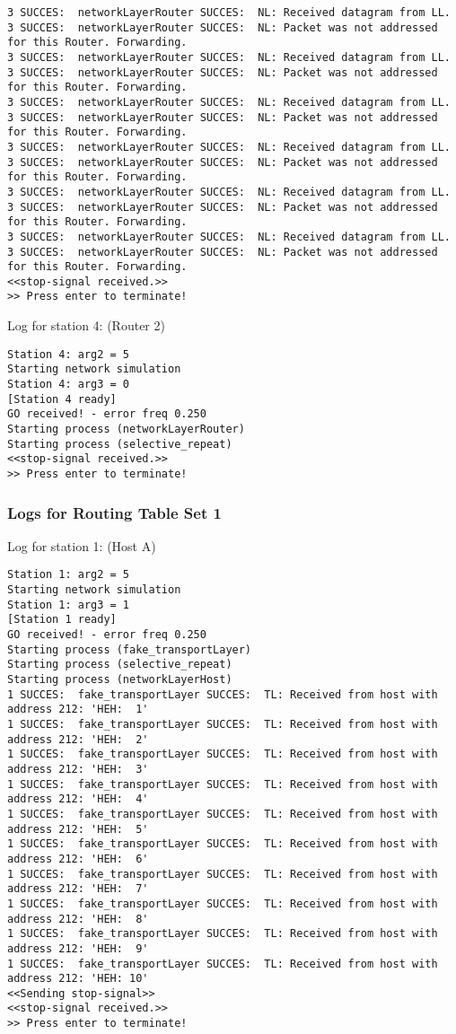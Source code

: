 \begin{lstlisting}[breaklines=true]
3 SUCCES:  networkLayerRouter SUCCES:  NL: Received datagram from LL.
3 SUCCES:  networkLayerRouter SUCCES:  NL: Packet was not addressed for this Router. Forwarding.
3 SUCCES:  networkLayerRouter SUCCES:  NL: Received datagram from LL.
3 SUCCES:  networkLayerRouter SUCCES:  NL: Packet was not addressed for this Router. Forwarding.
3 SUCCES:  networkLayerRouter SUCCES:  NL: Received datagram from LL.
3 SUCCES:  networkLayerRouter SUCCES:  NL: Packet was not addressed for this Router. Forwarding.
3 SUCCES:  networkLayerRouter SUCCES:  NL: Received datagram from LL.
3 SUCCES:  networkLayerRouter SUCCES:  NL: Packet was not addressed for this Router. Forwarding.
3 SUCCES:  networkLayerRouter SUCCES:  NL: Received datagram from LL.
3 SUCCES:  networkLayerRouter SUCCES:  NL: Packet was not addressed for this Router. Forwarding.
3 SUCCES:  networkLayerRouter SUCCES:  NL: Received datagram from LL.
3 SUCCES:  networkLayerRouter SUCCES:  NL: Packet was not addressed for this Router. Forwarding.
<<stop-signal received.>>
>> Press enter to terminate!
\end{lstlisting}

Log for station 4: (Router 2)
\begin{lstlisting}[breaklines=true]
Station 4: arg2 = 5
Starting network simulation
Station 4: arg3 = 0
[Station 4 ready]
GO received! - error freq 0.250
Starting process (networkLayerRouter)
Starting process (selective_repeat)
<<stop-signal received.>>
>> Press enter to terminate!
\end{lstlisting}

\subsubsection{Logs for Routing Table Set 1}
Log for station 1: (Host A)
\begin{lstlisting}[breaklines=true]
Station 1: arg2 = 5
Starting network simulation
Station 1: arg3 = 1
[Station 1 ready]
GO received! - error freq 0.250
Starting process (fake_transportLayer)
Starting process (selective_repeat)
Starting process (networkLayerHost)
1 SUCCES:  fake_transportLayer SUCCES:  TL: Received from host with address 212: 'HEH:  1'
1 SUCCES:  fake_transportLayer SUCCES:  TL: Received from host with address 212: 'HEH:  2'
1 SUCCES:  fake_transportLayer SUCCES:  TL: Received from host with address 212: 'HEH:  3'
1 SUCCES:  fake_transportLayer SUCCES:  TL: Received from host with address 212: 'HEH:  4'
1 SUCCES:  fake_transportLayer SUCCES:  TL: Received from host with address 212: 'HEH:  5'
1 SUCCES:  fake_transportLayer SUCCES:  TL: Received from host with address 212: 'HEH:  6'
1 SUCCES:  fake_transportLayer SUCCES:  TL: Received from host with address 212: 'HEH:  7'
1 SUCCES:  fake_transportLayer SUCCES:  TL: Received from host with address 212: 'HEH:  8'
1 SUCCES:  fake_transportLayer SUCCES:  TL: Received from host with address 212: 'HEH:  9'
1 SUCCES:  fake_transportLayer SUCCES:  TL: Received from host with address 212: 'HEH: 10'
<<Sending stop-signal>>
<<stop-signal received.>>
>> Press enter to terminate!
\end{lstlisting}

